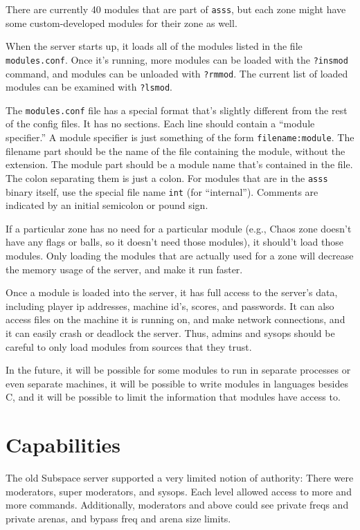 \documentclass{article}
\newcommand{\asss}{\texttt{asss}}
\begin{document}
There are currently
40
modules that are part of \asss{}, but each zone might have some
custom-developed modules for their zone as well.

When the server starts up, it loads all of the modules listed in the
file \verb/modules.conf/. Once it's running, more modules can be loaded
with the \verb/?insmod/ command, and modules can be unloaded with
\verb/?rmmod/. The current list of loaded modules can be examined with
\verb/?lsmod/.

The \verb/modules.conf/ file has a special format that's slightly
different from the rest of the config files. It has no sections. Each
line should contain a ``module specifier.'' A module specifier is just
something of the form \verb/filename:module/. The filename part should
be the name of the file containing the module, without the extension.
The module part should be a module name that's contained in the file.
The colon separating them is just a colon. For modules that are in the
\asss{} binary itself, use the special file name \verb/int/ (for
``internal''). Comments are indicated by an initial semicolon or pound
sign.

If a particular zone has no need for a particular module (e.g., Chaos
zone doesn't have any flags or balls, so it doesn't need those modules),
it should't load those modules. Only loading the modules that are
actually used for a zone will decrease the memory usage of the server,
and make it run faster.

Once a module is loaded into the server, it has full access to the
server's data, including player ip addresses, machine id's, scores, and
passwords. It can also access files on the machine it is running on, and
make network connections, and it can easily crash or deadlock the
server. Thus, admins and sysops should be careful to only load modules
from sources that they trust.

In the future, it will be possible for some modules to run in separate
processes or even separate machines, it will be possible to write
modules in languages besides C, and it will be possible to limit the
information that modules have access to.


\section{Capabilities}

The old Subspace server supported a very limited notion of authority:
There were moderators, super moderators, and sysops. Each level allowed
access to more and more commands. Additionally, moderators and above
could see private freqs and private arenas, and bypass freq and arena
size limits.
\end{document}
